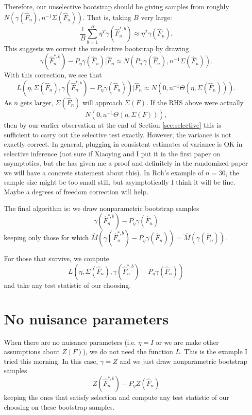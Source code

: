 \documentclass{article}
\begin{document}
Therefore, our unselective bootstrap should be giving samples from
roughly $ N(\gamma(\hat{F}_n), n^{-1} \Sigma(\hat{F}_n))$. That is,
taking $B$ very large:
$$
\frac{1}{B}\sum_{b=1}^B \eta^T \gamma(\hat{F}^{*,b}_n) \approx \eta^T\gamma(\hat{F}_n).
$$
This suggests we correct the unselective bootstrap by drawing
$$
\gamma(\hat{F}^{*,b}_n) - P_{\eta}\gamma(\hat{F}_n) | \hat{F}_n \approx N(P_{\eta}^{\perp}\gamma(\hat{F}_n) ,n^{-1} \Sigma(\hat{F}_n)).
$$
With this correction, we see that
$$
L(\eta, \Sigma(\hat{F}_n), \gamma(\hat{F}^{*,b}_n) - P_{\eta} \gamma(\hat{F}_n)) \big \vert \hat{F}_n
 \approx N(0 ,n^{-1} \Theta(\eta, \Sigma(\hat{F}_n))).
$$
As $n$ gets larger, $\Sigma(\hat{F}_n)$ will approach $\Sigma(F)$. 
If the RHS above were actually $$N(0 ,n^{-1} \Theta(\eta, \Sigma(F))),$$ then
by our earlier observation at the end of Section \ref{sec:selective} this is sufficient to carry out the selective test exactly.
However, the variance is not exactly correct. In general,
plugging in consistent estimates of variance is OK in selective inference (not sure
if Xiaoying and I put it in the first paper on asymptotics, but she has given me a proof and definitely in the
randomized paper we will have a concrete statement about this). In Rob's example of $n=30$, the sample size might be too small still, but asymptotically
I think it will be fine. Maybe a degrees of freedom correction will help.

The final algorithm is:
we draw nonparametric bootstrap samples
$$
\gamma(\hat{F}^{*,b}_n) - P_{\eta}\gamma(\hat{F}_n)
$$
keeping only those for which $\hat{M}(\gamma(\hat{F}^{*,b}_n) - P_{\eta}\gamma(\hat{F}_n)) = \hat{M}(\gamma(\hat{F}_n))$.

For those that survive, we compute
$$
L(\eta, \Sigma(\hat{F}_n), \gamma(\hat{F}^{*,b}_n) - P_{\eta}\gamma(\hat{F}_n))
$$
and take any test statistic of our choosing.

\section{No nuisance parameters}

When there are no nuisance parameters (i.e. $\eta=I$ or we are make other assumptions about $Z(F)$), we do not need the
function $L$. This is the example I tried this morning. In this
case, $\gamma=Z$ and we just draw nonparametric bootstrap samples
$$
Z(\hat{F}^{*,b}_n) - P_{\eta}Z(\hat{F}_n)
$$
keeping the ones that satisfy selection and compute any test statistic of our 
choosing on these bootstrap samples. 
\end{document}
